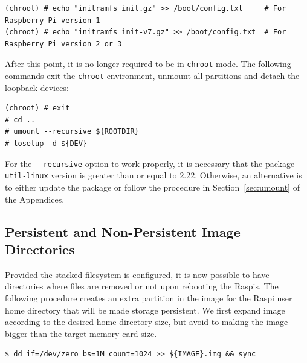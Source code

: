 \documentclass[electronics,article,accept,moreauthors,pdftex,10pt,a4paper]{mdpi}
\theoremstyle{mdpi}
\newcounter{ex}
\newcounter{re}
\theoremstyle{mdpidefinition}
\begin{document}
\begin{lstlisting}[]
(chroot) # echo "initramfs init.gz" >> /boot/config.txt     # For Raspberry Pi version 1
(chroot) # echo "initramfs init-v7.gz" >> /boot/config.txt  # For Raspberry Pi version 2 or 3
\end{lstlisting}
\FloatBarrier
\vspace{-5mm}

After this point, it is no longer required to be in \texttt{chroot} mode.
The following commands exit the \texttt{chroot} environment, unmount all
partitions and detach the loopback devices:

\begin{lstlisting}[]
(chroot) # exit
# cd ..
# umount --recursive ${ROOTDIR}
# losetup -d ${DEV}
\end{lstlisting}
\FloatBarrier
\vspace{-5mm}

For the \texttt{----recursive} option to work properly, it is necessary that
the package \texttt{util-linux} version is greater than or equal to 2.22.
Otherwise, an alternative is to either update the package or follow the
procedure in Section~\ref{sec:umount} of the Appendices.

\subsection{Persistent and Non-Persistent Image Directories}
\label{sec:non_persistent_directories}
Provided the stacked filesystem is configured, it is now possible to have
directories where files are removed or not upon rebooting the Raspis.
The following procedure creates an extra partition in the image for
the Raspi user home directory that will be made storage persistent.
We first expand image according to the desired
home directory size, but avoid to making the image bigger than the target
memory card size.

\begin{lstlisting}[]
$ dd if=/dev/zero bs=1M count=1024 >> ${IMAGE}.img && sync
\end{lstlisting}
\FloatBarrier
\vspace{-5mm}
\end{document}
